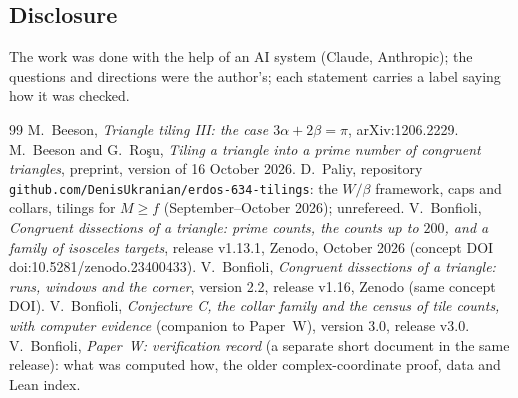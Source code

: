 \documentclass[11pt,reqno]{amsart}
\theoremstyle{plain}
\theoremstyle{definition}
\begin{document}
\subsection{Disclosure}
The work was done with the help of an AI system (Claude, Anthropic); the questions and directions were the author's; each statement carries a label saying how it was checked.

\begin{thebibliography}{99}
 M.~Beeson, \emph{Triangle tiling III: the case $3\alpha+2\beta=\pi$}, arXiv:1206.2229.
 M.~Beeson and G.~Ro\c{s}u, \emph{Tiling a triangle into a prime number of congruent triangles}, preprint, version of 16 October 2026.
 D.~Paliy, repository \texttt{github.com/DenisUkranian/erdos-634-tilings}: the $W/\beta$ framework, caps and collars, tilings for $M\ge f$ (September--October 2026); unrefereed.
 V.~Bonfioli, \emph{Congruent dissections of a triangle: prime counts, the counts up to $200$, and a family of isosceles targets}, release v1.13.1, Zenodo, October 2026 (concept DOI doi:10.5281/zenodo.23400433).
 V.~Bonfioli, \emph{Congruent dissections of a triangle: runs, windows and the corner}, version 2.2, release v1.16, Zenodo (same concept DOI).
 V.~Bonfioli, \emph{Conjecture C, the collar family and the census of tile counts, with computer evidence} (companion to Paper~W), version 3.0, release v3.0.
 V.~Bonfioli, \emph{Paper~W: verification record} (a separate short document in the same release): what was computed how, the older complex-coordinate proof, data and Lean index.
\end{thebibliography}
\end{document}
